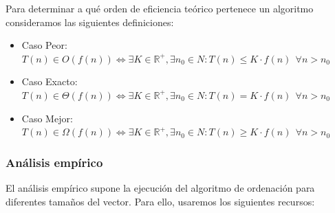 \documentclass[a4paper,12pt,twoside]{article} %
\begin{document}
Para determinar a qué orden de eficiencia teórico pertenece un algoritmo consideramos las siguientes definiciones:

\begin{itemize}

	\item Caso Peor:\\
	\begin{math}
	T(n) \in O(f(n)) \Leftrightarrow \exists K \in \mathbb{R^+} , \exists n_0 \in N : T(n) \leq K \cdot{f(n)} \ \ \forall n > n_0 		\end{math}
	
	\item Caso Exacto:\\
	\begin{math}	
	T(n) \in \Theta(f(n)) \Leftrightarrow \exists K \in \mathbb{R^+} , \exists n_0 \in N : T(n) = K \cdot{f(n)} \ \ \forall n > n_0
	\end{math}
	
	\item Caso Mejor:\\
	\begin{math}
	T(n) \in \Omega(f(n)) \Leftrightarrow \exists K \in \mathbb{R^+} , \exists n_0 \in N : T(n) \geq K \cdot{f(n)} \ \ \forall n > n_0
	\end{math}
	
\end{itemize}

\subsubsection{Análisis empírico}

El análisis empírico supone la ejecución del algoritmo de ordenación para diferentes tamaños del vector. Para ello, usaremos los siguientes recursos:\\
\end{document}
